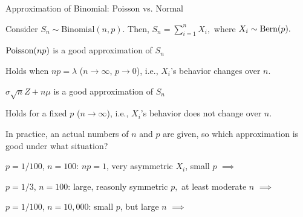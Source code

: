   
  




\begin{frame}{Approximation of Binomial: Poisson vs. Normal}
  
  \plitemsep 0.1in
  \bci
  
\item Consider $S_n \sim \text{Binomial}(n,p).$ Then, $S_n =
  \sum_{i=1}^n X_i,$ where $X_i \sim \text{Bern}(p).$
\item<2->  $\text{Poisson}(np)$ is a good approximation of $S_n$
  \bci
  \item<4-> Holds when $np = \lambda$ ($n \rightarrow \infty$, $p
    \rightarrow 0$), i.e., $X_i$'s behavior changes over $n.$
  \eci
\item<3->  $\sigma\sqrt{n}Z + n\mu$ is a good approximation of $S_n$  
  \bci
  \item<5-> Holds for a fixed $p$ ($n \rightarrow \infty$), i.e., $X_i$'s
    behavior does not change over $n.$
  \eci
\item<6-> In practice, an actual numbers of $n$ and $p$ are given, so
  which approximation is good under what situation? 
  \bci
  \item<7-> $p=1/100$, $n=100$: $np=1$, very asymmetric $X_i$, small $p$
    $\implies$ 
  \item<8-> $p=1/3$, $n=100$: large, reasonly symmetric $p,$ at least moderate $n$ $\implies$ 

  \item<9-> $p=1/100$, $n=10,000$: small $p$, but large $n$ $\implies$  
    \eci
  \eci
\end{frame}


